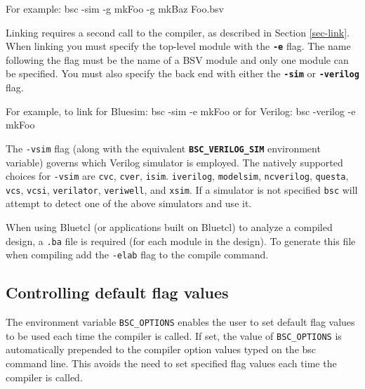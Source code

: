 \documentclass{article}
\newcommand{\te}[1]{\texttt{#1}}
\newenvironment{centerboxverbatim}
  {\center
   \boxedverbatim}
  {\endboxedverbatim
  {\endcenter }}
\begin{document}
For example:
\begin{centerboxverbatim}
bsc -sim -g mkFoo -g mkBaz Foo.bsv
\end{centerboxverbatim}

Linking requires a second call to the compiler, as described in
Section \ref{sec-link}.  When linking you must specify the
top-level module with the {\bf\tt -e} flag.  The name following the
flag must be the name of  a BSV module and only one module can be
specified.   You must also specify the back end with either the
{\bf\tt -sim}   or {\bf\tt -verilog} flag.

For example, to link for Bluesim:
\begin{centerboxverbatim}
bsc -sim -e mkFoo
\end{centerboxverbatim}
or for Verilog:
\begin{centerboxverbatim}
bsc -verilog -e mkFoo
\end{centerboxverbatim}


The \te{-vsim} flag
(along with the equivalent
\textbf{\texttt{BSC\_VERILOG\_SIM}} environment variable) governs which Verilog
simulator is employed.  The natively supported  choices for
\te{-vsim} are
\te{cvc},
\te{cver},
\te{isim}.
\te{iverilog},
\te{modelsim},
\te{ncverilog},
\te{questa},
\te{vcs},
\te{vcsi},
\te{verilator},
\te{veriwell},
and \te{xsim}.
If a simulator is not specified \te{bsc} will attempt to detect one
of the above simulators and use it.


When using Bluetcl (or applications built on Bluetcl) to analyze a compiled
design, a \te{.ba} file is required (for each module in the design).
To generate this file when compiling add the \te{-elab} flag to the compile command. 



\subsection{Controlling default flag values}
\index{BSC\_OPTIONS@\te{BSC\_OPTIONS}}

The environment variable \te{BSC\_OPTIONS} enables the user to set
default flag values to be used each time the compiler is called.  If
set, the value of \te{BSC\_OPTIONS} is automatically  prepended to the
compiler option values  typed on the bsc command line.  This avoids
the need to set specified flag values each time the compiler is called.

\end{document}
